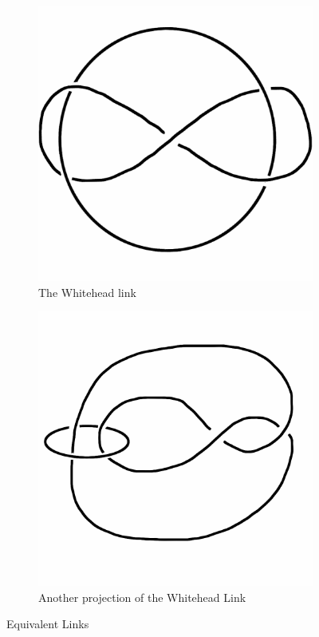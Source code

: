 \documentclass[12pt,letterpaper]{article}
\theoremstyle{definition}
\begin{document}
\begin{figure}[h]
     \centering
        \begin{subfigure}{.45\textwidth}
        \centering
        \includegraphics[width=\textwidth]{rgp10pics/whitehead1.png}
        \caption{The Whitehead link}
    \end{subfigure}
    \quad
    \begin{subfigure}{.45\textwidth}
        \centering
        \includegraphics[width=\textwidth]{rgp10pics/whitehead2.png}
        \caption{Another projection of the Whitehead Link}
    \end{subfigure}
    \caption{Equivalent Links}
\end{figure}
\end{document}
